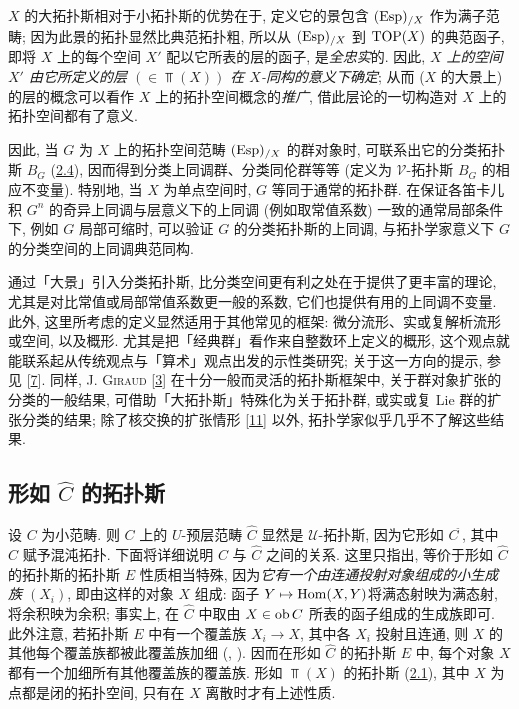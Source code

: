 $X$ 的大拓扑斯相对于小拓扑斯的优势在于, 定义它的景包含 $(\operatorname{Esp})_{/X}$ 作为满子范畴; 因为此景的拓扑显然比典范拓扑粗, 所以从 $(\operatorname{Esp})_{/X}$ 到 $\operatorname{TOP}(X)$ 的典范函子, 即将 $X$ 上的每个空间 $X'$ 配以它所表的层的函子, 是\emph{全忠实}的. 因此, \emph{$X$ 上的空间 $X'$ 由它所定义的层 $(\in \Top(X))$ 在 $X$-同构的意义下确定}; 从而 ($X$ 的大景上) 的层的概念可以看作 $X$ 上的拓扑空间概念的\emph{推广}, 借此层论的一切构造对 $X$ 上的拓扑空间都有了意义.

因此, 当 $G$ 为 $X$ 上的拓扑空间范畴 $(\operatorname{Esp})_{/X}$ 的群对象时, 可联系出它的分类拓扑斯 $B_G$ (\hyperref[IV.subsec2.4]{2.4}), 因而得到分类上同调群、分类同伦群等等 (定义为 $𝒱$-拓扑斯 $B_G$ 的相应不变量). 特别地, 当 $X$ 为单点空间时, $G$ 等同于通常的拓扑群. 在保证各笛卡儿积 $G^n$ 的奇异上同调与层意义下的上同调 (例如取常值系数) 一致的通常局部条件下, 例如 $G$ 局部可缩时, 可以验证 $G$ 的分类拓扑斯的上同调, 与拓扑学家意义下 $G$ 的分类空间的上同调典范同构.

通过「大景」引入\pageoriginale 分类拓扑斯, 比分类空间更有利之处在于提供了更丰富的理论, 尤其是对比常值或局部常值系数更一般的系数, 它们也提供有用的上同调不变量. 此外, 这里所考虑的定义显然适用于其他常见的框架: 微分流形、实或复解析流形或空间, 以及概形. 尤其是把「经典群」看作来自整数环上定义的概形, 这个观点就能联系起从传统观点与「算术」观点出发的示性类研究; 关于这一方向的提示, 参见 [\hyperref[IV.sec7]{7}]. 同样, J. \textsc{Giraud} [\hyperref[IV.sec3]{3}] 在十分一般而灵活的拓扑斯框架中, 关于群对象扩张的分类的一般结果, 可借助「大拓扑斯」特殊化为关于拓扑群, 或实或复 Lie 群的扩张分类的结果; 除了核交换的扩张情形 [\hyperref[IV.sec11]{11}] 以外, 拓扑学家似乎几乎不了解这些结果.

\subsection{形如 $\widehat{C}$ 的拓扑斯}

设 $C$ 为小范畴. 则 $C$ 上的 $U$-预层范畴 $\widehat{C}$ 显然是 $𝒰$-拓扑斯, 因为它形如 $C^{\widetilde{\phantom{,}}}$, 其中 $C$ 赋予混沌拓扑. 下面将详细说明 $C$ 与 $\widehat{C}$ 之间的关系. 这里只指出, 等价于形如 $\widehat{C}$ 的拓扑斯的拓扑斯 $E$ 性质相当特殊, 因为\emph{它有一个由连通投射对象组成的小生成族 $(X_i)$}, 即由这样的对象 $X$ 组成: 函子 $Y\mapsto \operatorname{Hom}(X,Y)$\pageoriginale 将满态射映为满态射, 将余积映为余积; 事实上, 在 $\widehat{C}$ 中取由 $X\in \operatorname{ob} C$ 所表的函子组成的生成族即可. 此外注意, 若拓扑斯 $E$ 中有一个覆盖族 $X_i\rightarrow X$, 其中各 $X_i$ 投射且连通, 则 $X$ 的其他每个覆盖族都被此覆盖族加细 (, ). 因而在形如 $\widehat{C}$ 的拓扑斯 $E$ 中, 每个对象 $X$ 都有一个加细所有其他覆盖族的覆盖族. 形如 $\Top(X)$ 的拓扑斯 (\hyperref[IV.subsec2.1]{2.1}), 其中 $X$ 为点都是闭的拓扑空间, 只有在 $X$ 离散时才有上述性质.

